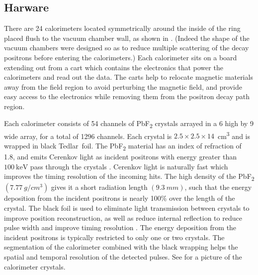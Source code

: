 \subsection{Harware}


There are 24 calorimeters located symmetrically around the inside of the ring placed flush to the vacuum chamber wall, as shown in . (Indeed the shape of the vacuum chambers were designed so as to reduce multiple scattering of the decay positrons before entering the calorimeters.) Each calorimeter sits on a board extending out from a cart which contains the electronics that power the calorimeters and read out the data. The carts help to relocate magnetic materials away from the field region to avoid perturbing the magnetic field, and provide easy access to the electronics while removing them from the positron decay path region.


Each calorimeter consists of 54 channels of PbF\textsubscript{2} crystals arrayed in a 6 high by 9 wide array, for a total of 1296 channels. Each crystal is $2.5 \times 2.5 \times 14$~cm\textsuperscript{3} and is wrapped in black Tedlar\textregistered\ foil. The PbF\textsubscript{2} material has an index of refraction of 1.8, and emits Cerenkov light as incident positrons with energy greater than $\SI{100}{\keV}$ pass through the crystals \cite{Fienberg:2014kka}. Cerenkov light is naturally fast which improves the timing resolution of the incoming hits. The high density of the PbF\textsubscript{2} $(\SI{7.77}{g/cm^{3}})$ gives it a short radiation length $(\SI{9.3}{mm})$, such that the energy deposition from the incident positrons is nearly 100\% over the length of the crystal. The black foil is used to eliminate light transmission between crystals to improve position reconstruction, as well as reduce internal reflection to reduce pulse width and improve timing resolution \cite{Kaspar:2016ofv}. The energy deposition from the incident positrons is typically restricted to only one or two crystals. The segmentation of the calorimeter combined with the black wrapping helps the spatial and temporal resolution of the detected pulses. See  for a picture of the calorimeter crystals.


